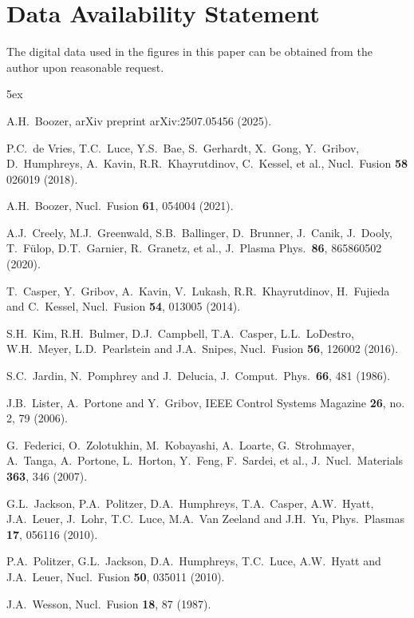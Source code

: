 \documentclass[12pt,prb,aps]{revtex4-1}
\begin{document}
\section*{Data Availability Statement}
The digital data used in the figures in this paper can be obtained from the author upon reasonable request. 

\begin{thebibliography}{99}\baselineskip 5ex

   A.H.~Boozer, arXiv preprint arXiv:2507.05456 (2025). 

 P.C.~de Vries, T.C.~Luce, Y.S.~Bae, S.~Gerhardt, X.~Gong, Y.~Gribov, 
D.~Humphreys, A.~Kavin, R.R.~Khayrutdinov, C.~Kessel, et al., Nucl.\ Fusion {\bf 58} 026019 (2018).

 A.H.~Boozer, Nucl.\ Fusion {\bf 61}, 054004 (2021). 

 A.J.~Creely, M.J.~Greenwald, S.B.~Ballinger, D.~Brunner, J.~Canik, J.~Dooly, 
T.~F\"{u}lop, D.T.~Garnier, R.~Granetz, et al.,  J.\ Plasma Phys.\ {\bf 86}, 865860502 (2020).

 T.~Casper, Y.~Gribov, A.~Kavin, V.~Lukash, R.R.~Khayrutdinov, H.~Fujieda and C.~Kessel, Nucl.\ Fusion {\bf 54}, 013005 (2014).

 S.H.~Kim, R.H.~Bulmer, D.J.~Campbell, T.A.~Casper, L.L.~LoDestro, W.H.~Meyer, L.D.~Pearlstein and J.A.~Snipes,
Nucl.\ Fusion {\bf 56}, 126002 (2016).

 S.C.~Jardin, N.~Pomphrey and J.~Delucia, J.\ Comput.\ Phys.\ {\bf 66}, 481 (1986).

 J.B.~Lister, A.~Portone and Y.~Gribov, IEEE Control Systems Magazine {\bf 26}, no. 2, 79 (2006).

 G.~Federici, O.~Zolotukhin, M.~Kobayashi, A.~Loarte, G.~Strohmayer, A.~Tanga, A.~Portone, L.~Horton,
Y.~Feng, F.~Sardei, et al., J.\ Nucl.\ Materials {\bf 363}, 346 (2007). 

 G.L.~Jackson, P.A.~Politzer, D.A.~Humphreys, T.A.~Casper, A.W.~Hyatt, J.A.~Leuer, J.~Lohr,
T.C.~Luce, M.A.~Van Zeeland and J.H.~Yu, Phys.\ Plasmas {\bf 17}, 056116 (2010).

 P.A.~Politzer, G.L.~Jackson, D.A.~Humphreys, T.C.~Luce, A.W.~Hyatt and J.A.~Leuer, Nucl.\ Fusion {\bf 50}, 035011 (2010).

 J.A.~Wesson, Nucl.\ Fusion {\bf 18}, 87 (1987).


\end{thebibliography}
\end{document}
